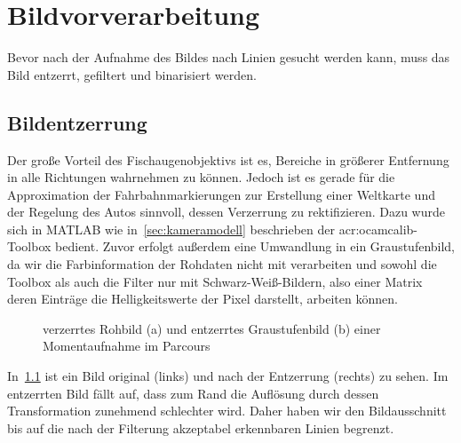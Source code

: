 \chapter{Bildvorverarbeitung \dcfirstauthorshort}
\label{cha:bildvorverarbeitung}

Bevor nach der Aufnahme des Bildes nach Linien gesucht werden kann, muss das Bild entzerrt, gefiltert und binarisiert werden. 

\section{Bildentzerrung}

Der große Vorteil des Fischaugenobjektivs ist es, Bereiche in größerer Entfernung in alle Richtungen  wahrnehmen zu können. Jedoch ist es gerade für die Approximation der Fahrbahnmarkierungen zur Erstellung einer Weltkarte und der Regelung des Autos sinnvoll, dessen Verzerrung zu rektifizieren. Dazu wurde sich in MATLAB wie in~\ref{sec:kameramodell} beschrieben der \gls{acr:ocamcalib}-Toolbox bedient. Zuvor erfolgt außerdem eine Umwandlung in ein Graustufenbild, da wir die Farbinformation der Rohdaten nicht mit verarbeiten und sowohl die Toolbox als auch die Filter nur mit Schwarz-Weiß-Bildern, also einer Matrix deren Einträge die Helligkeitswerte der Pixel darstellt, arbeiten können. 

\begin{figure}[ht] %
  \centering
  \qquad
  \caption{verzerrtes Rohbild (a) und entzerrtes Graustufenbild (b) einer Momentaufnahme im Parcours}
\label{fig:bildvorverarbeitung_entzerren}
\end{figure} 

In~\ref{fig:bildvorverarbeitung_entzerren} ist ein Bild original (links) und nach der Entzerrung (rechts) zu sehen. Im entzerrten Bild fällt auf, dass zum Rand die Auflösung durch dessen Transformation zunehmend schlechter wird. 
Daher haben wir den Bildausschnitt bis auf die nach der Filterung akzeptabel erkennbaren Linien begrenzt.

